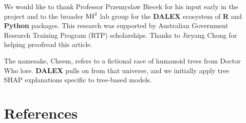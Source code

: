 \documentclass[
]{article}
\begin{document}
We would like to thank Professor Przemyslaw Biecek for his input early
in the project and to the broader \(\text{MI}^\text2\) lab group for the
\textbf{DALEX} ecosystem of \textbf{R} and \textbf{Python} packages.
This research was supported by Australian Government Research Training
Program (RTP) scholarships. Thanks to Jieyang Chong for helping
proofread this article.

The namesake, Cheem, refers to a fictional race of humanoid trees from
Doctor Who lore. \textbf{DALEX} pulls on from that universe, and we
initially apply tree SHAP explanations specific to tree-based models.

\hypertarget{references}{%
\section*{References}\label{references}}
\end{document}
